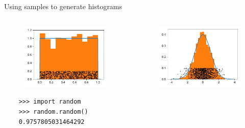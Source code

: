 \documentclass[12pt, aspectratio=149]{beamer}
\theoremstyle{plain}
\begin{document}
	\begin{frame}[fragile]{Using samples to generate histograms}
	\begin{columns}
	\begin{column}{0.5\textwidth}
		\begin{center}
		 \begin{figure}
			 \centering
			 \includegraphics[width=0.99\linewidth]{figures/uniform_samples_hist}
		 \end{figure}
		 \begin{verbatim}
	>>> import random
	>>> random.random()
	0.9757805031464292
		 \end{verbatim}
		 \end{center}
	\end{column}
	\begin{column}{0.5\textwidth}  %
		\begin{center}
		 \begin{figure}
			 \centering
			 \includegraphics[width=0.99\linewidth]{figures/normal_samples_hist}

\end{figure}
\end{center}
\end{column}
\end{columns}
\end{frame}
\end{document}
